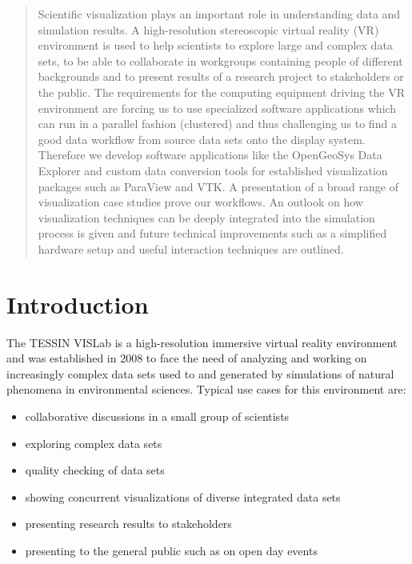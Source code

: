 \begin{abstract}
Scientific visualization plays an important role in understanding data
and simulation results. A high-resolution stereoscopic virtual reality
(VR) environment is used to help scientists to explore large and complex
data sets, to be able to collaborate in workgroups containing people of
different backgrounds and to present results of a research project to
stakeholders or the public. The requirements for the computing equipment
driving the VR environment are forcing us to use specialized
software applications which can run in a parallel fashion (clustered)
and thus challenging us to find a good data workflow from source data
sets onto the display system. Therefore we develop software applications
like the OpenGeoSys Data Explorer and custom data conversion tools for
established visualization packages such as ParaView and VTK. A
presentation of a broad range of visualization case studies prove our
workflows. An outlook on how visualization techniques can be deeply
integrated into the simulation process is given and future technical
improvements such as a simplified hardware setup and useful interaction
techniques are outlined.
\end{abstract}


\section{Introduction}
\label{introduction}

The TESSIN VISLab is a high-resolution immersive virtual reality
environment and was established in 2008 to face the need of analyzing
and working on increasingly complex data sets used to and generated by
simulations of natural phenomena in environmental sciences. Typical use
cases for this environment are:

\begin{itemize}
\itemsep1pt\parskip0pt
\item
  collaborative discussions in a small group of scientists
\item
  exploring complex data sets
\item
  quality checking of data sets
\item
  showing concurrent visualizations of diverse integrated data sets
\item
  presenting research results to stakeholders
\item
  presenting to the general public such as on open day events
\end{itemize}

